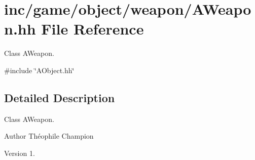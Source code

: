 \hypertarget{AWeapon_8hh}{}\section{inc/game/object/weapon/\+A\+Weapon.hh File Reference}
\label{AWeapon_8hh}


Class A\+Weapon.  


{\ttfamily \#include \char`\"{}A\+Object.\+hh\char`\"{}}\newline


\subsection{Detailed Description}
Class A\+Weapon. 

\begin{DoxyAuthor}{Author}
Théophile Champion 
\end{DoxyAuthor}
\begin{DoxyVersion}{Version}
1. 
\end{DoxyVersion}
